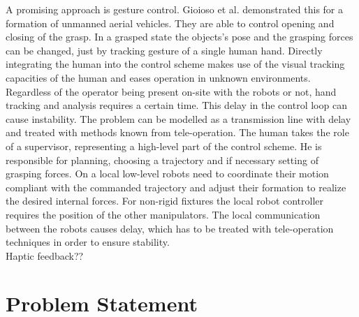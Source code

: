 \documentclass[a4paper,twoside, openright,12pt]{report}
\begin{document}
A promising approach is gesture control. Gioioso et al. \cite{Gioioso_2014} demonstrated this for a formation of unmanned aerial vehicles. They are able to control opening and closing of the grasp. In a grasped state the objects's pose and the grasping forces can be changed, just by tracking gesture of a single human hand. 
Directly integrating the human into the control scheme makes use of the visual tracking capacities of the human and eases operation in unknown environments. Regardless of the operator being present on-site with the robots or not, hand tracking and analysis requires a certain time. This delay in the control loop can cause instability. The problem can be modelled as a transmission line with delay and treated with methods known from tele-operation.
The human takes the role of a supervisor, representing a high-level part of the control scheme. He is responsible for planning, choosing a trajectory and if necessary setting of grasping forces.
On a local low-level robots need to coordinate their motion compliant with the commanded trajectory and adjust their formation to realize the desired internal forces. For non-rigid fixtures the local robot controller requires the position of the other manipulators. The local communication between the robots causes delay, which has to be treated with tele-operation techniques in order to ensure stability.\\
Haptic feedback??

 

\section{Problem Statement}

\end{document}
